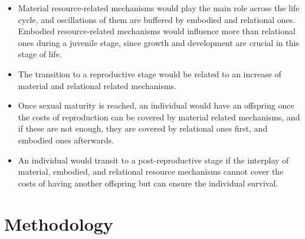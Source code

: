 \documentclass{article}
\begin{document}
\begin{itemize}
    \begin{itemize}
        \item Material resource-related mechanisms would play the main role across the life cycle, and oscillations of them are buffered by embodied and relational ones. Embodied resource-related mechanisms would influence more than relational ones during a juvenile stage, since growth and development are crucial in this stage of life. 
        \item The transition to a reproductive stage would be related to an increase of material and relational  related mechanisms.
        \item Once sexual maturity is reached, an individual would have an offspring once the costs of reproduction can be covered by material related mechanisms, and if these are not enough, they are covered by relational ones first, and embodied ones afterwards. 
        \item An individual would transit to a post-reproductive stage if the interplay of material, embodied, and relational resource mechanisms cannot cover the costs of having another offspring but can ensure the individual survival.
    \end{itemize}
\end{itemize}

\section{Methodology}
\end{document}

